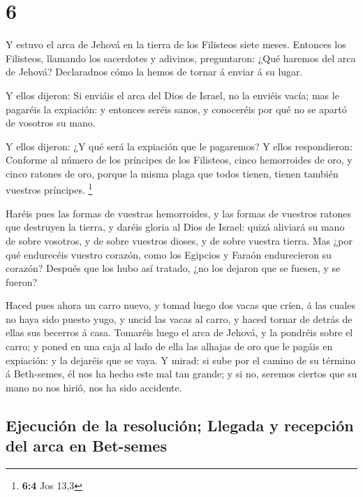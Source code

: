\hypertarget{section-5}{%
\section{6}\label{section-5}}

 Y estuvo el arca de Jehová en la tierra de los Filisteos
siete meses.  Entonces los Filisteos, llamando los
sacerdotes y adivinos, preguntaron: ¿Qué haremos del arca de Jehová?
Declaradnos cómo la hemos de tornar á enviar á su lugar.

 Y ellos dijeron: Si enviáis el arca del Dios de Israel,
no la enviéis vacía; mas le pagaréis la expiación: y entonces seréis
sanos, y conoceréis por qué no se apartó de vosotros su mano.

 Y ellos dijeron: ¿Y qué será la expiación que le
pagaremos? Y ellos respondieron: Conforme al número de los príncipes de
los Filisteos, cinco hemorroides de oro, y cinco ratones de oro, porque
la misma plaga que todos tienen, tienen también vuestros príncipes.
\footnote{\textbf{6:4} Jos 13,3}

 Haréis pues las formas de vuestras hemorroides, y las
formas de vuestros ratones que destruyen la tierra, y daréis gloria al
Dios de Israel: quizá aliviará su mano de sobre vosotros, y de sobre
vuestros dioses, y de sobre vuestra tierra.  Mas ¿por qué
endurecéis vuestro corazón, como los Egipcios y Faraón endurecieron su
corazón? Después que los hubo así tratado, ¿no los dejaron que se
fuesen, y se fueron?

 Haced pues ahora un carro nuevo, y tomad luego dos vacas
que críen, á las cuales no haya sido puesto yugo, y uncid las vacas al
carro, y haced tornar de detrás de ellas sus becerros á casa.
 Tomaréis luego el arca de Jehová, y la pondréis sobre el
carro; y poned en una caja al lado de ella las alhajas de oro que le
pagáis en expiación: y la dejaréis que se vaya.  Y mirad:
si sube por el camino de su término á Beth-semes, él nos ha hecho este
mal tan grande; y si no, seremos ciertos que su mano no nos hirió, nos
ha sido accidente.

\hypertarget{ejecuciuxf3n-de-la-resoluciuxf3n-llegada-y-recepciuxf3n-del-arca-en-bet-semes}{%
\subsection{Ejecución de la resolución; Llegada y recepción del arca en
Bet-semes}\label{ejecuciuxf3n-de-la-resoluciuxf3n-llegada-y-recepciuxf3n-del-arca-en-bet-semes}}

